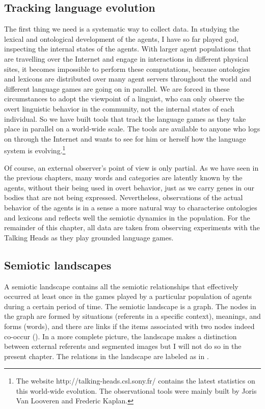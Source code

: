 \subsection{Tracking language evolution}

The first thing we need is a systematic
way to collect data. In studying the lexical 
and ontological development 
of the agents, I have so far played god, inspecting 
the internal states of the agents. With larger agent
populations that 
are travelling over the Internet and engage in interactions in 
different physical sites, it becomes impossible
to perform these computations, because ontologies and 
lexicons are distributed over many agent servers
throughout the world and different language games are
going on in parallel. We 
are forced in these circumstances to adopt the
viewpoint of a linguist, who
can only observe the overt linguistic behavior in the community,
not the internal states of each individual. 
So we have built tools that track the language games 
as they take place in parallel on a world-wide scale. The tools 
are available to anyone who logs on through the Internet
and wants to see for him or herself how the language
system is evolving.\footnote{The website http://talking-heads.csl.sony.fr/ 
contains the latest statistics on this world-wide evolution. 
The observational tools were mainly built by Joris Van 
Looveren and Frederic Kaplan.}

Of course, an external observer's
point of view is only partial. As we have seen in the
previous chapters, many 
words and categories are latently known by the agents, 
without their being used in overt behavior, just as 
we carry genes in our bodies that are not 
being expressed. Nevertheless, 
observations of the actual behavior of the agents is
in a sense a more natural way to characterise 
ontologies and lexicons and reflects well the
semiotic dynamics in the population. For the remainder
of this chapter, all data
are taken from observing experiments with the Talking Heads as
they play grounded language games. 

\subsection{Semiotic landscapes}

A semiotic landscape contains all the semiotic relationships
that effectively occurred at least once
in the games played by a particular population of agents
during a certain period of time. 
The semiotic landscape is a graph. The nodes in the
graph are formed by situations (referents in a specific context), 
meanings, and forms (words),
and there are links if the items associated with two nodes
indeed co-occur (). In a more complete
picture, the landscape makes a distinction between 
external referents and segmented images but I will not 
do so in the present chapter. The relations in the landscape are labeled as in .

